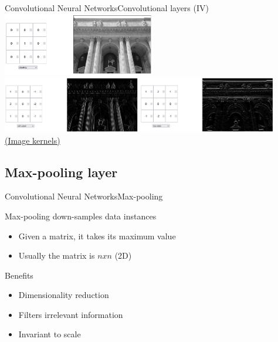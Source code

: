 \documentclass[10pt,compress]{beamer} %
\begin{document}
\begin{frame}{Convolutional Neural Networks}{Convolutional layers (IV)}
	\centering
	\includegraphics[width=0.5\textwidth]{figs/convolution1.png}\\\bigskip
	\includegraphics[width=0.45\textwidth]{figs/convolution2.png}
	\includegraphics[width=0.45\textwidth]{figs/convolution3.png}\\
    \bigskip
    \href{https://setosa.io/ev/image-kernels/}{(Image kernels)}
\end{frame}

\subsection{Max-pooling layer}
\begin{frame}{Convolutional Neural Networks}{Max-pooling}

    \bigskip

    \begin{flushleft}
    Max-pooling down-samples data instances
	\begin{itemize}
		\item Given a matrix, it takes its maximum value
		\item Usually the matrix is $n x n$ (2D)
	\end{itemize}
	Benefits
	\begin{itemize}
		\item Dimensionality reduction
		\item Filters irrelevant information
        \item Invariant to scale
	\end{itemize}
    \end{flushleft}
\end{frame}
\end{document}
